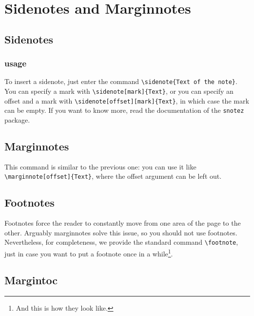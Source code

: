 \renewcommand*{\chapterformat}
{
  \enskip\mbox{\scalebox{4}{\thechapter\autodot}}
}
\renewcommand\chapterlinesformat[3]
{
  \parbox[b]{\textwidth+\marginparsep+\marginparwidth}{\hrulefill#2}\par%
  #3%
}
\setchapterpreamble[u]{\margintoc}
\chapter{Sidenotes and Marginnotes}

\section{Sidenotes}

\subsection{usage}

To insert a sidenote, just enter the command \verb|\sidenote{Text of the note}|. You can specify a mark with \verb|\sidenote[mark]{Text}|, or you can specify 
an offset and a mark with \verb|\sidenote[offset][mark]{Text}|, in which 
case the mark can be empty. If you want to know more, read the 
documentation of the \verb|snotez| package.

\section{Marginnotes}

This command is similar to the previous one: you can use it like 
\verb|\marginnote[offset]{Text}|, where the offset argument can be left 
out.\marginnote{\blindtext}

\section{Footnotes}

Footnotes force the reader to constantly move from one area of the page 
to the other. Arguably marginnotes solve this issue, so you should not 
use footnotes. Nevertheless, for completeness, we provide the standard 
command \verb|\footnote|, just in case you want to put a footnote once 
in a while\footnote{And this is how they look like.}.

\section{Margintoc}

